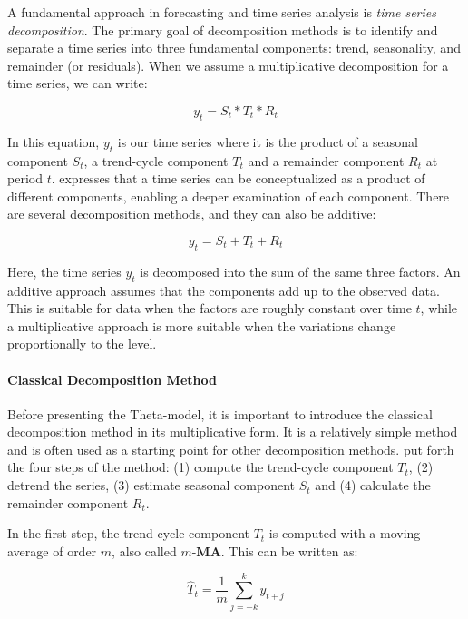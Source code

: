 \documentclass[12pt,a4paper]{article}
\begin{document}
A fundamental approach in forecasting and time series analysis is \textit{time series decomposition}. The primary goal of decomposition methods is to identify and separate a time series into three fundamental components: trend, seasonality, and remainder (or residuals). When we assume a multiplicative decomposition for a time series, we can write: 

\begin{equation}
  y_t=S_t\ast T_t\ast R_t
  \label{decomposition}
\end{equation}

In this equation, $y_t$ is our time series where it is the product of a seasonal component $S_t$, a trend-cycle component $T_t$ and a remainder component $R_t$ at period $t$. \cite{HyndmanForecasting2021} expresses that a time series can be conceptualized as a product of different components, enabling a deeper examination of each component. There are several decomposition methods, and they can also be additive: 

\begin{equation}
  y_t=S_t+T_t+R_t
  \label{decompositionadditive}
\end{equation}

Here, the time series $y_t$ is decomposed into the sum of the same three factors. An additive approach assumes that the components add up to the observed data. This is suitable for data when the factors are roughly constant over time $t$, while a multiplicative approach is more suitable when the variations change proportionally to the level. 

\paragraph{Classical Decomposition Method}
Before presenting the Theta-model, it is important to introduce the classical decomposition method in its multiplicative form. It is a relatively simple method and is often used as a starting point for other decomposition methods. \cite{HyndmanForecasting2021} put forth the four steps of the method: (1) compute the trend-cycle component $T_t$, (2) detrend the series, (3) estimate seasonal component $S_t$ and (4) calculate the remainder component $R_t$. 

In the first step, the trend-cycle component $T_t$ is computed with a moving average of order $m$, also called $m$-\textbf{MA}. This can be written as: 

\begin{equation}
  {\hat{T}}_t=\frac{1}{m}\sum_{j=-k}^{k}y_{t+j}
  \label{trendcycle}
\end{equation}
\end{document}
